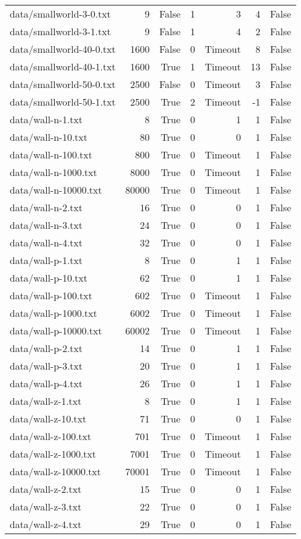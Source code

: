 \begin{tabular}{lrrrrrr}
data/smallworld-3-0.txt & 9 & False & 1 & 3 & 4 & False \\
data/smallworld-3-1.txt & 9 & False & 1 & 4 & 2 & False \\
data/smallworld-40-0.txt & 1600 & False & 0 & Timeout & 8 & False \\
data/smallworld-40-1.txt & 1600 & True & 1 & Timeout & 13 & False \\
data/smallworld-50-0.txt & 2500 & False & 0 & Timeout & 3 & False \\
data/smallworld-50-1.txt & 2500 & True & 2 & Timeout & -1 & False \\
data/wall-n-1.txt & 8 & True & 0 & 1 & 1 & False \\
data/wall-n-10.txt & 80 & True & 0 & 0 & 1 & False \\
data/wall-n-100.txt & 800 & True & 0 & Timeout & 1 & False \\
data/wall-n-1000.txt & 8000 & True & 0 & Timeout & 1 & False \\
data/wall-n-10000.txt & 80000 & True & 0 & Timeout & 1 & False \\
data/wall-n-2.txt & 16 & True & 0 & 0 & 1 & False \\
data/wall-n-3.txt & 24 & True & 0 & 0 & 1 & False \\
data/wall-n-4.txt & 32 & True & 0 & 0 & 1 & False \\
data/wall-p-1.txt & 8 & True & 0 & 1 & 1 & False \\
data/wall-p-10.txt & 62 & True & 0 & 1 & 1 & False \\
data/wall-p-100.txt & 602 & True & 0 & Timeout & 1 & False \\
data/wall-p-1000.txt & 6002 & True & 0 & Timeout & 1 & False \\
data/wall-p-10000.txt & 60002 & True & 0 & Timeout & 1 & False \\
data/wall-p-2.txt & 14 & True & 0 & 1 & 1 & False \\
data/wall-p-3.txt & 20 & True & 0 & 1 & 1 & False \\
data/wall-p-4.txt & 26 & True & 0 & 1 & 1 & False \\
data/wall-z-1.txt & 8 & True & 0 & 1 & 1 & False \\
data/wall-z-10.txt & 71 & True & 0 & 0 & 1 & False \\
data/wall-z-100.txt & 701 & True & 0 & Timeout & 1 & False \\
data/wall-z-1000.txt & 7001 & True & 0 & Timeout & 1 & False \\
data/wall-z-10000.txt & 70001 & True & 0 & Timeout & 1 & False \\
data/wall-z-2.txt & 15 & True & 0 & 0 & 1 & False \\
data/wall-z-3.txt & 22 & True & 0 & 0 & 1 & False \\
data/wall-z-4.txt & 29 & True & 0 & 0 & 1 & False \\
\end{tabular}